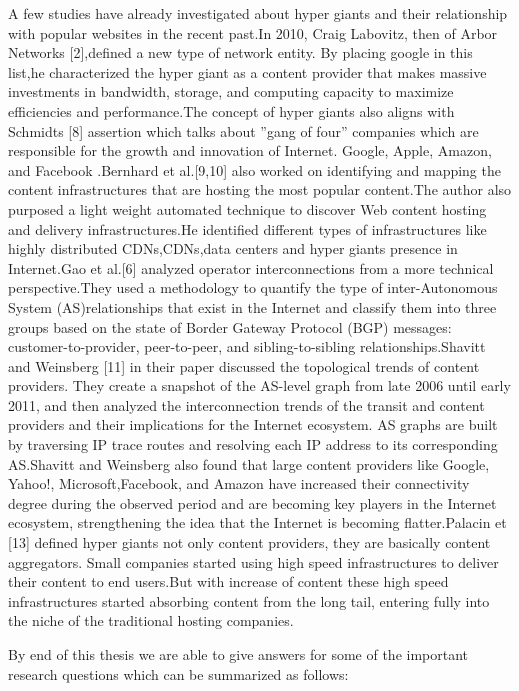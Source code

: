 A few studies have already investigated about hyper giants and their relationship with popular websites in the recent past.In 2010, Craig Labovitz, then
of Arbor Networks [2],defined a new type of network entity. By placing google
in this list,he characterized the hyper giant as a content provider that makes
massive investments in bandwidth, storage, and computing capacity to maximize efficiencies and performance.The concept of hyper giants also aligns with
Schmidts [8] assertion which talks about ”gang of four” companies which are responsible for the growth and innovation of Internet. Google, Apple, Amazon,
and Facebook .Bernhard et al.[9,10] also worked on identifying and mapping the
content infrastructures that are hosting the most popular content.The author also purposed a light weight automated technique to discover Web content hosting and delivery infrastructures.He identified different types of infrastructures like highly distributed CDNs,CDNs,data centers and hyper giants presence in Internet.Gao et al.[6] analyzed operator interconnections from a more technical perspective.They used a methodology to quantify the type of inter-Autonomous System (AS)relationships that exist in the Internet and classify them into three groups based
on the state of Border Gateway Protocol (BGP) messages: customer-to-provider,
peer-to-peer, and sibling-to-sibling relationships.Shavitt and Weinsberg [11] in their paper
discussed the topological trends of content providers. They create a snapshot
of the AS-level graph from late 2006 until early 2011, and then analyzed the interconnection trends of the transit and content providers and their implications for the Internet ecosystem. AS graphs are built by traversing IP trace routes and resolving each IP address to its corresponding AS.Shavitt and Weinsberg also found that large content providers like Google, Yahoo!, Microsoft,Facebook, and Amazon have increased their connectivity degree during the observed period and are becoming key players in the Internet ecosystem, strengthening the
idea that the Internet is becoming flatter.Palacin et [13] defined hyper giants not
only content providers, they are basically content aggregators. Small companies started using high speed infrastructures to deliver their content to end users.But with increase of content  these high speed infrastructures started absorbing content from the
long tail, entering fully into the niche of the traditional hosting companies.

By end of this thesis we are able to give answers for some of the important
research questions which can be summarized as follows:

